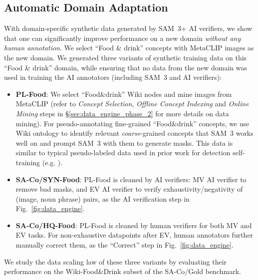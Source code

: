 \documentclass[]{fairmeta}
\newcommand{\model}{SAM~3\xspace}
\newcommand{\dsname}{{SA-Co}\xspace}
\newcommand{\trainhq}{{\dsname/HQ}\xspace}
\newcommand{\trainsyn}{{\dsname/SYN}\xspace}
\newcommand{\evalgold}{{\dsname/Gold}\xspace}
\begin{document}
\subsection{Automatic Domain Adaptation} 
\label{sec:auto_domain_adapt}
With domain-specific synthetic data generated by \model + AI verifiers, we show that one can significantly improve performance on a new domain \textit{without any human annotation}. We select ``Food \& drink'' concepts with MetaCLIP images as the new domain. We generated three variants of synthetic training data on this ``Food \& drink'' domain, while ensuring that no data from the new domain was used in training the AI annotators (including \model and AI verifiers):
\begin{itemize}
	\item \textbf{PL-Food}: We select ``Food\&drink'' Wiki nodes and mine images from MetaCLIP (refer to \textit{Concept Selection}, \textit{Offline Concept Indexing} and \textit{Online Mining} steps in \S\ref{sec:data_engine_phase_2} for more details on data mining). For pseudo-annotating fine-grained ``Food\&drink'' concepts, we use Wiki ontology to identify relevant \textit{coarse}-grained concepts that \model works well on and prompt \model with them to generate masks. This data is similar to typical pseudo-labeled data used in prior work for detection self-training (e.g. \cite{minderer2022simple}).
	\item \textbf{\trainsyn-Food}: PL-Food is cleaned by AI verifiers: MV AI verifier to remove bad masks, and EV AI verifier to verify exhaustivity/negativity of (image, noun phrase) pairs, as the AI verification step in Fig.~\ref{fig:data_engine}.
	\item \textbf{\trainhq-Food}: PL-Food is cleaned by human verifiers for both MV and EV tasks. For non-exhaustive datapoints after EV, human annotators further manually correct them, as the ``Correct'' step in Fig.~\ref{fig:data_engine}. 
\end{itemize}
We study the data scaling law of these three variants by evaluating their performance on the Wiki-Food\&Drink subset of the \evalgold benchmark.
\end{document}
